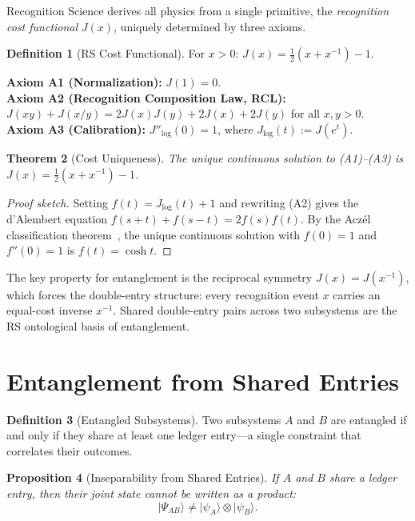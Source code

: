 \documentclass[12pt,a4paper]{article}
\newtheorem{theorem}{Theorem}[section]
\newtheorem{proposition}[theorem]{Proposition}
\theoremstyle{definition}
\newtheorem{definition}[theorem]{Definition}
\theoremstyle{remark}
\begin{document}
Recognition Science derives all physics from a single primitive,
the \emph{recognition cost functional} $J(x)$, uniquely determined
by three axioms.

\begin{definition}[RS Cost Functional]
For $x > 0$: $J(x) = \tfrac{1}{2}(x + x^{-1}) - 1$.
\end{definition}

\noindent\textbf{Axiom A1 (Normalization):} $J(1) = 0$.\\
\textbf{Axiom A2 (Recognition Composition Law, RCL):}
$J(xy) + J(x/y) = 2J(x)J(y) + 2J(x) + 2J(y)$ for all $x, y > 0$.\\
\textbf{Axiom A3 (Calibration):} $J''_{\log}(0) = 1$, where
$J_{\log}(t) := J(e^t)$.

\begin{theorem}[Cost Uniqueness]
\label{thm:unique}
The unique continuous solution to \textup{(A1)--(A3)} is
$J(x) = \tfrac{1}{2}(x + x^{-1}) - 1$.
\end{theorem}

\begin{proof}[Proof sketch]
Setting $f(t) = J_{\log}(t) + 1$ and rewriting \textup{(A2)} gives the
d'Alembert equation $f(s+t) + f(s-t) = 2f(s)f(t)$.  By the Acz\'el
classification theorem~\cite{Aczel1966}, the unique continuous solution
with $f(0) = 1$ and $f''(0) = 1$ is $f(t) = \cosh t$.
\end{proof}

\noindent The key property for entanglement is the reciprocal symmetry
$J(x) = J(x^{-1})$, which forces the double-entry structure: every
recognition event $x$ carries an equal-cost inverse $x^{-1}$.  Shared
double-entry pairs across two subsystems are the RS ontological basis of
entanglement.

\section{Entanglement from Shared Entries}
\label{sec:shared}

\begin{definition}[Entangled Subsystems]
\label{def:entangled}
Two subsystems $A$ and $B$ are entangled if and only if they
share at least one ledger entry---a single constraint that
correlates their outcomes.
\end{definition}

\begin{proposition}[Inseparability from Shared Entries]
\label{thm:inseparable}
If $A$ and $B$ share a ledger entry, then their joint state
cannot be written as a product:
\begin{equation}
  |\Psi_{AB}\rangle \neq |\psi_A\rangle \otimes |\psi_B\rangle.
\end{equation}
\end{proposition}
\end{document}
